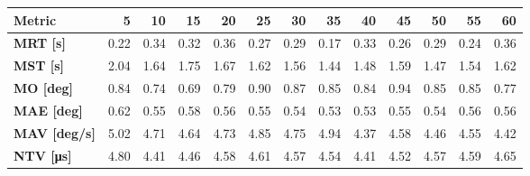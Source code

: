 \begin{tabular*}{\textwidth}{@{\extracolsep{\fill}}l|rrrrrrrrrrrr}
    \toprule
    \textbf{Metric} & \textbf{5} & \textbf{10} & \textbf{15} & \textbf{20} & \textbf{25} & \textbf{30} & \textbf{35} & \textbf{40} & \textbf{45} & \textbf{50} & \textbf{55} & \textbf{60} \\
    \midrule
    \textbf{MRT [s]} & 0.22 & 0.34 & 0.32 & 0.36 & 0.27 & 0.29 & 0.17 & 0.33 & 0.26 & 0.29 & 0.24 & 0.36 \\
    \textbf{MST [s]} & 2.04 & 1.64 & 1.75 & 1.67 & 1.62 & 1.56 & 1.44 & 1.48 & 1.59 & 1.47 & 1.54 & 1.62 \\
    \textbf{MO  [deg]} & 0.84 & 0.74 & 0.69 & 0.79 & 0.90 & 0.87 & 0.85 & 0.84 & 0.94 & 0.85 & 0.85 & 0.77 \\
    \textbf{MAE [deg]} & 0.62 & 0.55 & 0.58 & 0.56 & 0.55 & 0.54 & 0.53 & 0.53 & 0.55 & 0.54 & 0.56 & 0.56 \\
    \textbf{MAV [deg/s]} & 5.02 & 4.71 & 4.64 & 4.73 & 4.85 & 4.75 & 4.94 & 4.37 & 4.58 & 4.46 & 4.55 & 4.42 \\
    \textbf{NTV [\si{\micro\second}]} & 4.80 & 4.41 & 4.46 & 4.58 & 4.61 & 4.57 & 4.54 & 4.41 & 4.52 & 4.57 & 4.59 & 4.65 \\
    \bottomrule
\end{tabular*}

